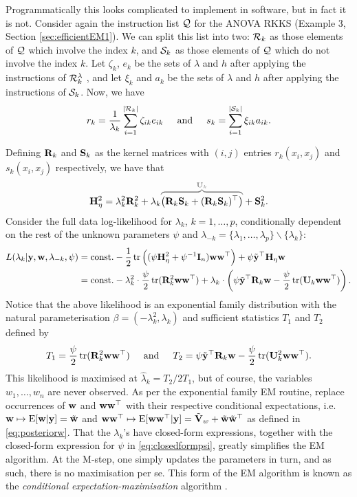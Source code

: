 Programmatically this looks complicated to implement in software, but in fact it is not.
Consider again the instruction list $\cQ$ for the ANOVA RKKS (Example 3, Section \ref{sec:efficientEM1}).
We can split this list into two: $\cR_k$ as those elements of $\cQ$ which involve the index $k$, and $\cS_k$ as those elements of $\cQ$ which do not involve the index $k$.
Let $\zeta_k$, $e_k$ be the sets of $\lambda$ and $h$ after applying the instructions of $\cR_k^\lambda$ 
, and let $\xi_k$ and $a_k$ be the sets of $\lambda$ and $h$ after applying the instructions of $\cS_k$.
Now, we have 
\[
  r_k = \frac{1}{\lambda_k} \sum_{i=1}^{\abs{\cR_k}} \zeta_{ik} e_{ik} 
  \hspace{0.5cm}\text{and}\hspace{0.5cm}
  s_k = \sum_{i=1}^{\abs{\cS_k}} \xi_{ik} a_{ik}.   
\]

Defining $\bR_k$ and $\bS_k$ as the kernel matrices with $(i,j)$ entries $r_k(x_i,x_j)$ and $s_k(x_i,x_j)$ respectively, we have that
\[
  \bH_\eta^2 = \lambda_k^2\bR_k^2 + \lambda_k \myoverbrace{\big(\bR_k\bS_k + (\bR_k\bS_k)^\top \big)}{\bU_k} + \bS_k^2.
\]
Consider the full data log-likelihood for $\lambda_k$, $k=1,\dots,p$, conditionally dependent on the rest of the unknown parameters $\psi$ and $\lambda_{-k} = \{\lambda_1,\dots,\lambda_p\} \backslash \{ \lambda_k \}$:
\begin{align*}
  L(\lambda_k|\by,\bw,\lambda_{-k},\psi)
  &= \const 
  - \half \tr \Big( (
  \psi\bH_\eta^2 + \psi^{-1}\bI_n
  )\bw\bw^\top \Big)
  + \psi \tilde\by^\top \bH_\eta \bw \\
  &= \const 
  - \lambda_k^2 \cdot \half[\psi] \tr(\bR_k^2 \bw\bw^\top)
  + \lambda_k \cdot \left( 
  \psi \tilde\by^\top \bR_k \bw - \half[\psi] \tr(\bU_k \bw\bw^\top)
  \right).
\end{align*}
Notice that the above likelihood is an exponential family distribution with the natural parameterisation $\beta = (-\lambda_k^2, \lambda_k)$ and sufficient statistics $T_1$ and $T_2$ defined by
\[
  T_1 = \half[\psi] \tr(\bR_k^2 \bw\bw^\top)
  \hspace{0.5cm}\text{and}\hspace{0.5cm}
  T_2 =  \psi\tilde\by^\top \bR_k \bw - \half[\psi]\tr(\bU_k^2 \bw\bw^\top).
\]
This likelihood is maximised at $\hat\lambda_k = T_2/2T_1$, but of course, the variables $w_1,\dots,w_n$ are never observed.
As per the exponential family EM routine, replace occurrences of $\bw$ and $\bw\bw^\top$ with their respective conditional expectations, i.e. $\bw\mapsto\E[\bw|\by] = \wtilde$ and $\bw\bw^\top\mapsto\E[\bw\bw^\top|\by] = \tilde\bV_w + \wtilde\wtilde^\top$ as defined in \eqref{eq:posteriorw}.
That the $\lambda_k$'s have closed-form expressions, together with the closed-form expression for $\psi$ in \eqref{eq:closedformpsi}, greatly simplifies the EM algorithm.
At the M-step, one simply updates the parameters in turn, and as such, there is no maximisation per se.
This form of the EM algorithm is known as the \emph{conditional expectation-maximisation} algorithm \citep{meng1993maximum}.

